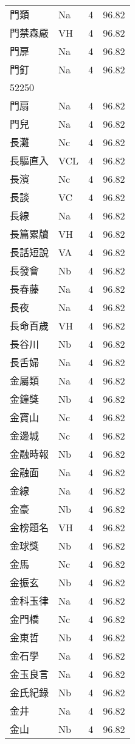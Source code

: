 \documentclass[twocolumn]{book}
\begin{document}
\begin{supertabular}{llrr}
門類 & Na & 4 &  96.82\\
門禁森嚴 & VH & 4 &  96.82\\
門扉 & Na & 4 &  96.82\\
門釘 & Na & 4 &  96.82\\
52250\\
門扇 & Na & 4 &  96.82\\
門兒 & Na & 4 &  96.82\\
長灘 & Nc & 4 &  96.82\\
長驅直入 & VCL & 4 &  96.82\\
長濱 & Nc & 4 &  96.82\\
長談 & VC & 4 &  96.82\\
長線 & Na & 4 &  96.82\\
長篇累牘 & VH & 4 &  96.82\\
長話短說 & VA & 4 &  96.82\\
長發會 & Nb & 4 &  96.82\\
長春藤 & Na & 4 &  96.82\\
長夜 & Na & 4 &  96.82\\
長命百歲 & VH & 4 &  96.82\\
長谷川 & Nb & 4 &  96.82\\
長舌婦 & Na & 4 &  96.82\\
金屬類 & Na & 4 &  96.82\\
金鐘獎 & Nb & 4 &  96.82\\
金寶山 & Nc & 4 &  96.82\\
金邊城 & Nc & 4 &  96.82\\
金融時報 & Nb & 4 &  96.82\\
金融面 & Na & 4 &  96.82\\
金線 & Na & 4 &  96.82\\
金豪 & Nb & 4 &  96.82\\
金榜題名 & VH & 4 &  96.82\\
金球獎 & Nb & 4 &  96.82\\
金馬 & Nc & 4 &  96.82\\
金振玄 & Nb & 4 &  96.82\\
金科玉律 & Na & 4 &  96.82\\
金門橋 & Nc & 4 &  96.82\\
金東哲 & Nb & 4 &  96.82\\
金石學 & Na & 4 &  96.82\\
金玉良言 & Na & 4 &  96.82\\
金氏紀錄 & Nb & 4 &  96.82\\
金井 & Na & 4 &  96.82\\
金山 & Nb & 4 &  96.82\\

\end{supertabular}
\end{document}
